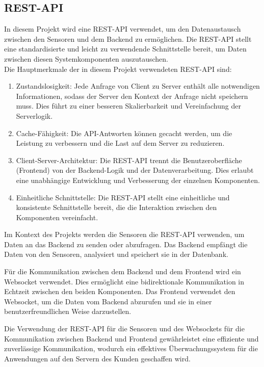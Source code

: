 \begin{flushleft}
\subsection{REST-API}
In diesem Projekt wird eine REST-API verwendet, um den Datenaustausch zwischen den Sensoren und dem Backend zu ermöglichen. Die REST-API stellt eine standardisierte und leicht zu verwendende Schnittstelle bereit, um Daten zwischen diesen Systemkomponenten auszutauschen.
\\
Die Hauptmerkmale der in diesem Projekt verwendeten REST-API sind:
\begin{enumerate}
\item Zustandslosigkeit: Jede Anfrage von Client zu Server enthält alle notwendigen Informationen, sodass der Server den Kontext der Anfrage nicht speichern muss. Dies führt zu einer besseren Skalierbarkeit und Vereinfachung der Serverlogik.
\item Cache-Fähigkeit: Die API-Antworten können gecacht werden, um die Leistung zu verbessern und die Last auf dem Server zu reduzieren.
\item Client-Server-Architektur: Die REST-API trennt die Benutzeroberfläche (Frontend) von der Backend-Logik und der Datenverarbeitung. Dies erlaubt eine unabhängige Entwicklung und Verbesserung der einzelnen Komponenten.
\item Einheitliche Schnittstelle: Die REST-API stellt eine einheitliche und konsistente Schnittstelle bereit, die die Interaktion zwischen den Komponenten vereinfacht.
\end{enumerate}

Im Kontext des Projekts werden die Sensoren die REST-API verwenden, um Daten an das Backend zu senden oder abzufragen. Das Backend empfängt die Daten von den Sensoren, analysiert und speichert sie in der Datenbank.

Für die Kommunikation zwischen dem Backend und dem Frontend wird ein Websocket verwendet. Dies ermöglicht eine bidirektionale Kommunikation in Echtzeit zwischen den beiden Komponenten. Das Frontend verwendet den Websocket, um die Daten vom Backend abzurufen und sie in einer benutzerfreundlichen Weise darzustellen.

Die Verwendung der REST-API für die Sensoren und des Websockets für die Kommunikation zwischen Backend und Frontend gewährleistet eine effiziente und zuverlässige Kommunikation, wodurch ein effektives Überwachungssystem für die Anwendungen auf den Servern
des Kunden geschaffen wird.




\end{flushleft}
